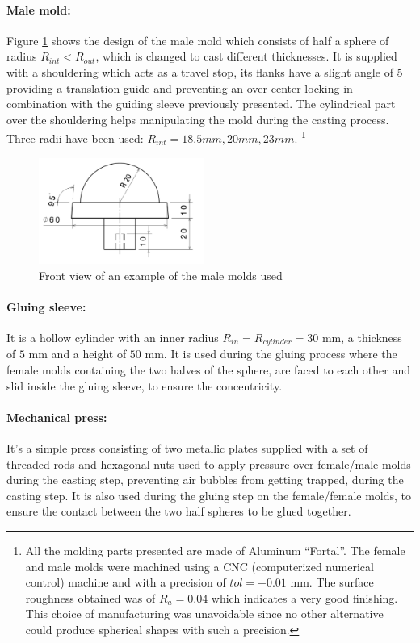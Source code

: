 \paragraph{Male mold:}
Figure \ref{fig:male_mold} shows the design of the male mold which consists of half a sphere of radius $R_{int}<R_{out}$, which is changed to cast different thicknesses. It is supplied with a shouldering which acts as a travel stop, its flanks have a slight angle of 5 providing a translation guide and preventing an over-center locking in combination with the guiding sleeve previously presented. The cylindrical part over the shouldering helps manipulating the mold during the casting process. Three radii have been used: $R_{int} = 18.5 mm, 20 mm, 23 mm$. 
\footnote{All the molding parts presented are made of Aluminum "`Fortal"'. The female and male molds were machined using a CNC (computerized numerical control)  machine and with a precision of $tol =\pm 0.01$ mm. The surface roughness obtained was of $R_a = 0.04$ which indicates a very good finishing.
This choice of manufacturing was unavoidable since no other alternative could produce spherical shapes with such a precision.}
\begin{figure}[H] %
	\centering%
  \includegraphics[width=0.48\textwidth]{figures/Chapter_1/male_mold.jpg}
	\caption{Front view of an example of the male molds used}
	\label{fig:male_mold}
\end{figure}

\paragraph{Gluing sleeve:}
It is a hollow cylinder with an inner radius $R_{in} = R_{cylinder} = 30$ mm, a thickness of $5$ mm and a height of $50$ mm. It is used during the gluing process where the female molds containing the two halves of the sphere, are faced to each other and slid inside the gluing sleeve, to ensure the concentricity.

\paragraph{Mechanical press:}
It's a simple press consisting of two metallic plates supplied with a set of threaded rods and hexagonal nuts used to apply pressure over female/male molds during the casting step, preventing air bubbles from getting trapped, during the casting step. It is also used during the gluing step on the female/female molds, to ensure the contact between the two half spheres to be glued together.


